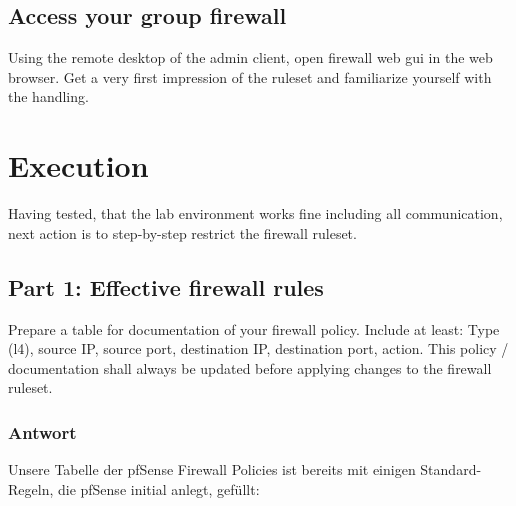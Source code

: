 \documentclass{article}
\begin{document}
\vspace{0.5em}

\subsection{Access your group firewall}

Using the remote desktop of the admin client, open firewall web gui in the web 
browser. Get a very first impression of the ruleset and familiarize yourself with the 
handling.

\section{Execution}

Having tested, that the lab environment works fine including all communication, next 
action is to step-by-step restrict the firewall ruleset.

\subsection{Part 1: Effective firewall rules}

Prepare a table for documentation of your firewall policy. Include at least: Type 
(l4), source IP, source port, destination IP, destination port, action. This policy / 
documentation shall always be updated before applying changes to the firewall 
ruleset.

\subsubsection*{Antwort}

\vspace{5mm}

Unsere Tabelle der pfSense Firewall Policies ist bereits mit einigen Standard-Regeln, 
die pfSense initial anlegt, gefüllt:

\begin{center}
\end{center}
\end{document}
